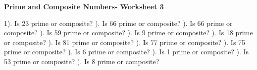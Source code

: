 \documentclass{article}%
\begin{document}
\newline%
\newline%
\pagebreak%
\large%
\begin{center}%
\textbf{Prime and Composite Numbers- Worksheet 3}%
\newline%
\end{center} \normalsize%
1). Is 23 prime or composite?%
\newline%
\newline%
). Is 66 prime or composite?%
\newline%
\newline%
). Is 66 prime or composite?%
\newline%
\newline%
). Is 59 prime or composite?%
\newline%
\newline%
). Is 9 prime or composite?%
\newline%
\newline%
). Is 18 prime or composite?%
\newline%
\newline%
). Is 81 prime or composite?%
\newline%
\newline%
). Is 77 prime or composite?%
\newline%
\newline%
). Is 75 prime or composite?%
\newline%
\newline%
). Is 6 prime or composite?%
\newline%
\newline%
). Is 1 prime or composite?%
\newline%
\newline%
). Is 53 prime or composite?%
\newline%
\newline%
). Is 8 prime or composite?%
\newline%
\newline%
\end{document}
